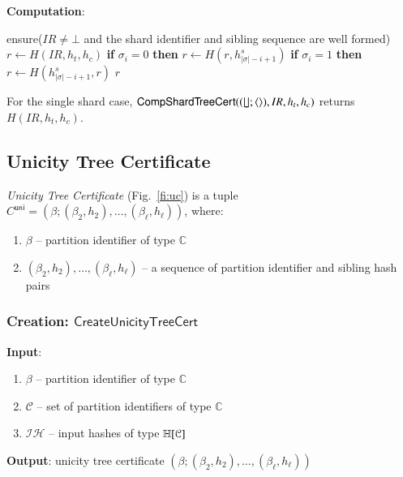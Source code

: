 \textbf{Computation}:

\begin{algorithmic}[0]
	\State ensure($IR\ne\bot$ and the shard identifier and sibling sequence are well formed)
	\State $r \gets H(IR,h_t,h_c)$
		\State \textbf{if} $\sigma_i = 0$ \textbf{then} $r \gets  H(r, h^s_{|\sigma|-i+1})$
		\State \textbf{if} $\sigma_i = 1$ \textbf{then} $r \gets  H(h^s_{|\sigma|-i+1}, r)$
	\EndFor
	\State \Return $r$
\end{algorithmic}

For the single shard case, $\mathsf{CompShardTreeCert}((\lfloor\!\rfloor; \langle\rangle), IR, h_t, h_c)$ returns $H(IR,h_t,h_c)$.

\subsection{Unicity Tree Certificate}\label{se:unicity-tree-certificate}

\emph{Unicity Tree Certificate} (Fig.~\ref{fi:uc}) is a tuple $C^\mathsf{uni} = (\beta; (\beta_2, h_2), \ldots, (\beta_\ell, h_\ell))$, where:
\begin{enumerate}
	\item $\beta$ -- partition identifier of type $\mathbb{C}$
	\item $(\beta_2, h_2), \ldots, (\beta_\ell, h_\ell)$ -- a sequence of partition identifier and sibling hash pairs
\end{enumerate}

\subsubsection{Creation: $\mathsf{CreateUnicityTreeCert}$}\label{se:create-unicity-tree-cert}

\textbf{Input}:
\begin{enumerate}
	\item $\beta$ -- partition identifier of type $\mathbb{C}$
	\item $\mathcal{C}$ -- set of partition identifiers of type $\mathbb{C}$
	\item $\mathcal{IH}$ -- input hashes of type $\mathbb{H}[\mathcal{C}]$
\end{enumerate}

\textbf{Output}: unicity tree certificate $(\beta; (\beta_2, h_2), \ldots, (\beta_\ell, h_\ell))$

